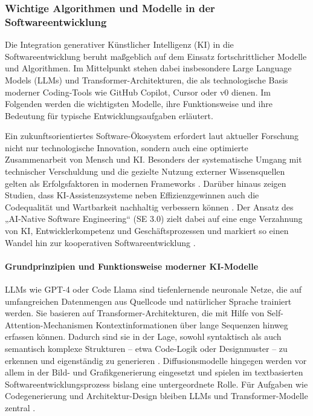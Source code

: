 \subsubsection{Wichtige Algorithmen und Modelle in der Softwareentwicklung}

Die Integration generativer Künstlicher Intelligenz (KI) in die
Softwareentwicklung beruht maßgeblich auf dem Einsatz fortschrittlicher Modelle
und Algorithmen. Im Mittelpunkt stehen dabei insbesondere Large Language Models
(LLMs) und Transformer-Architekturen, die als technologische Basis moderner
Coding-Tools wie GitHub Copilot, Cursor oder v0 dienen. Im Folgenden werden die
wichtigsten Modelle, ihre Funktionsweise und ihre Bedeutung für typische
Entwicklungsaufgaben erläutert.

Ein zukunftsorientiertes Software-Ökosystem erfordert laut aktueller Forschung
nicht nur technologische Innovation, sondern auch eine optimierte
Zusammenarbeit von Mensch und KI. Besonders der systematische Umgang mit
technischer Verschuldung und die gezielte Nutzung externer Wissensquellen
gelten als Erfolgsfaktoren in modernen Frameworks
\cite{matsumoto_conceptual_2021}. Darüber hinaus zeigen Studien, dass
KI-Assistenzsysteme neben Effizienzgewinnen auch die Codequalität und
Wartbarkeit nachhaltig verbessern können \cite{martinovic_impact_2024}. Der
Ansatz des „AI-Native Software Engineering“ (SE 3.0) zielt dabei auf eine enge
Verzahnung von KI, Entwicklerkompetenz und Geschäftsprozessen und markiert so
einen Wandel hin zur kooperativen Softwareentwicklung
\cite{hassan_towards_2024}.

\paragraph{Grundprinzipien und Funktionsweise moderner KI-Modelle}

LLMs wie GPT-4 oder Code Llama sind tiefenlernende neuronale Netze, die auf
umfangreichen Datenmengen aus Quellcode und natürlicher Sprache trainiert
werden. Sie basieren auf Transformer-Architekturen, die mit Hilfe von
Self-Attention-Mechanismen Kontextinformationen über lange Sequenzen hinweg
erfassen können. Dadurch sind sie in der Lage, sowohl syntaktisch als auch
semantisch komplexe Strukturen – etwa Code-Logik oder Designmuster – zu
erkennen und eigenständig zu generieren \cite{nguyen-duc_generative_2023,
    esposito_generative_2025}. Diffusionsmodelle hingegen werden vor allem in der
Bild- und Grafikgenerierung eingesetzt und spielen im textbasierten
Softwareentwicklungsprozess bislang eine untergeordnete Rolle. Für Aufgaben wie
Codegenerierung und Architektur-Design bleiben LLMs und Transformer-Modelle
zentral \cite{weisz_design_2024}.

